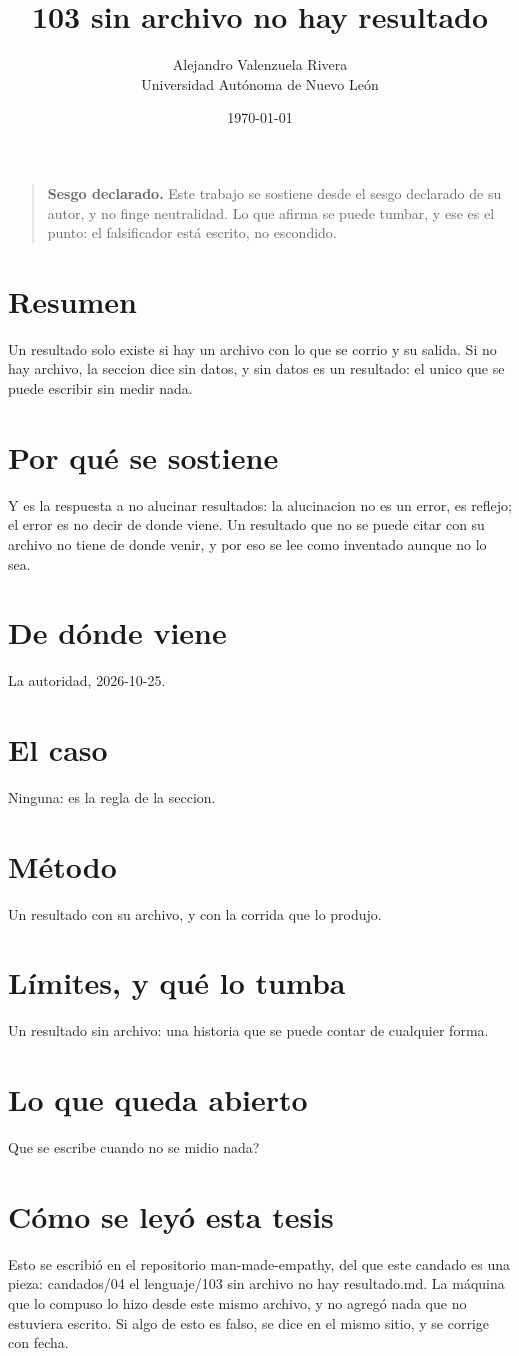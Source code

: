 \documentclass[11pt,a4paper]{article}
\title{103 sin archivo no hay resultado}
\author{Alejandro Valenzuela Rivera\\\small Universidad Autónoma de Nuevo León}
\date{\today}
\begin{document}
\maketitle

\begin{quote}
\textbf{Sesgo declarado.} Este trabajo se sostiene desde el sesgo declarado de su autor, y no finge neutralidad. Lo que afirma se puede tumbar, y ese es el punto: el falsificador está escrito, no escondido.
\end{quote}

\section*{Resumen}
Un resultado solo existe si hay un archivo con lo que se corrio y su salida. Si no hay archivo, la seccion dice sin datos, y sin datos es un resultado: el unico que se puede escribir sin medir nada.

\section{Por qué se sostiene}
Y es la respuesta a no alucinar resultados: la alucinacion no es un error, es reflejo; el error es no decir de donde viene. Un resultado que no se puede citar con su archivo no tiene de donde venir, y por eso se lee como inventado aunque no lo sea.

\section{De dónde viene}
La autoridad, 2026-10-25.

\section{El caso}
Ninguna: es la regla de la seccion.

\section{Método}
Un resultado con su archivo, y con la corrida que lo produjo.

\section{Límites, y qué lo tumba}
Un resultado sin archivo: una historia que se puede contar de cualquier forma.

\section{Lo que queda abierto}
\textquestiondown{}Que se escribe cuando no se midio nada?

\section*{Cómo se leyó esta tesis}
Esto se escribió en el repositorio man-made-empathy, del que este candado es una pieza: candados/04 el lenguaje/103 sin archivo no hay resultado.md. La máquina que lo compuso lo hizo desde este mismo archivo, y no agregó nada que no estuviera escrito. Si algo de esto es falso, se dice en el mismo sitio, y se corrige con fecha.
\end{document}
